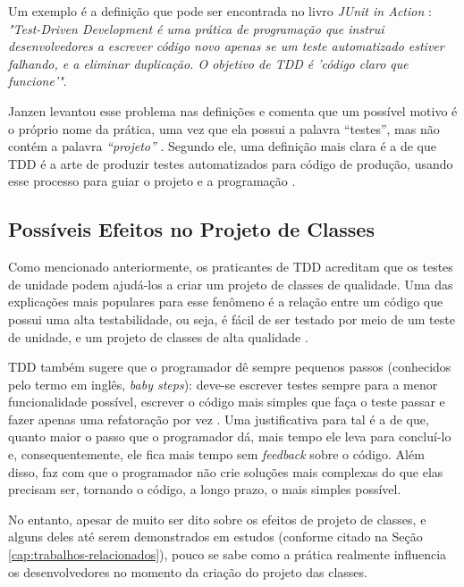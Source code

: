 \documentclass[conference]{IEEEtran}
\begin{document}
Um exemplo é a definição que pode ser encontrada no livro \textit{JUnit
in Action} \cite{junit-in-action}: \textit{"Test-Driven Development é uma
prática de programação que instrui desenvolvedores a escrever código novo
apenas se um teste automatizado estiver falhando, e a eliminar duplicação. O
objetivo de TDD é 'código claro que funcione'"}.

Janzen levantou esse problema nas definições e comenta que um possível 
motivo é o próprio nome da prática, uma vez
que ela possui a palavra ``testes'', mas não contém a palavra \textit{``projeto''} 
\cite{tdd-really-improve}.
Segundo ele, uma definição mais clara é a de que TDD é a arte de produzir testes
automatizados para código de produção, usando esse processo para guiar o 
projeto e a programação \cite{agilealliance-tdd} \cite{tdd-taxonomy}.

\subsection{Possíveis Efeitos no Projeto de Classes}

Como mencionado anteriormente, os praticantes de TDD acreditam que os testes de unidade
podem ajudá-los a criar um projeto de classes de qualidade. Uma das explicações mais
populares para esse fenômeno é a relação
entre um código que possui uma alta testabilidade, ou seja, é fácil de ser testado
por meio de um teste de unidade, e um projeto de classes de alta qualidade \cite{feathers-synergy}.

TDD também sugere que o programador dê sempre pequenos passos (conhecidos pelo termo em
inglês, \textit{baby steps}): deve-se escrever testes sempre para a menor
funcionalidade possível, escrever o código mais simples que faça o teste passar
e fazer apenas uma refatoração por vez \cite{TDDByExample}.
Uma justificativa para tal é a de que, quanto maior o passo que o programador dá, mais
tempo ele leva para concluí-lo e, consequentemente, ele fica mais tempo
sem \textit{feedback} sobre o código. Além disso, faz com que o programador não crie
soluções mais complexas do que elas precisam ser, tornando o código, a longo
prazo, o mais simples possível.

No entanto, apesar de muito ser dito sobre os efeitos de projeto de classes, e alguns deles
até serem demonstrados em estudos (conforme citado na Seção \ref{cap:trabalhos-relacionados}), 
pouco se sabe como a prática realmente influencia os desenvolvedores no momento da criação do
projeto das classes.
\end{document}
